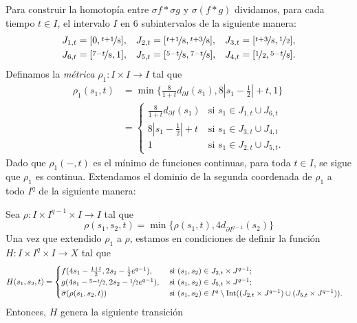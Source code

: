 \begin{dem}
    Para construir la homotopía entre $\sigma f*\sigma g$ y $\sigma (f*g)$ dividamos, para cada tiempo $t\in I$, el intervalo $I$ en 6 subintervalos  de la siguiente manera:
   \begin{align*}
    J_{1,t} &= [0, \nicefrac{t+1}{8}], & J_{2,t} &= [\nicefrac{t+1}{8}, \nicefrac{t+3}{8}], & J_{3,t} &= [\nicefrac{t+3}{8}, \nicefrac{1}{2}], \\
    J_{6,t} &= [\nicefrac{7-t}{8}, 1], & J_{5,t} &= [\nicefrac{5-t}{8}, \nicefrac{7-t}{8}], & J_{4,t} &= [\nicefrac{1}{2}, \nicefrac{5-t}{8}].
\end{align*}
    Definamos la \textit{métrica} $\rho_1:I\times I\to I$ tal que
    \begin{align*}
        \rho_1(s_1,t)&=\min\{\textstyle\frac{8}{1+t}d_{\partial I}(s_1),8|s_1-\frac{1}{2}|+t,1\}\\
        &=\begin{cases}
            \textstyle\frac{8}{1+t}d_{\partial I}(s_1)& \text{si } s_1\in J_{1,t}\cup J_{6,t}\\
            8|s_1-\frac{1}{2}|+t& \text{si } s_1\in J_{3,t}\cup J_{4,t}\\
            1&\text{si } s_1\in J_{2,t}\cup J_{5,t}.
        \end{cases}
    \end{align*}
    Dado que $\rho_1(-,t)$ es el mínimo de funciones continuas, para toda $t\in I$, se sigue que $\rho_1$ es continua. Extendamos el dominio de la segunda coordenada de $\rho_1$ a todo $I^q$ de la siguiente manera: 
    
    Sea $\rho:I\times I^{q-1}\times I\to I$ tal que
    \[
    \rho(s_1,s_2,t)=\min\{\rho(s_1,t),4d_{\partial I^{q-1}}(s_2)\}
    \]
    Una vez que extendido $\rho_1$ a $\rho$, estamos en condiciones de definir la función $H:I\times I^q\times I\to X$ tal que
    \begin{align*}
        H(s_1,s_2,t)&=\begin{cases}
            f(4s_1-\frac{1+t}{2},2s_2-\frac{1}{2}e^{q-1}), & \text{ si } (s_1,s_2)\in J_{2,t}\times J^{q-1};\\
            g(4s_1-\nicefrac{5-t}{2},2s_2-\nicefrac{1}{2}e^{q-1}), & \text{ si } (s_1,s_2)\in J_{5,t}\times J^{q-1};\\
            \overline{\sigma}(\rho(s_1,s_2,t))
            & \text{ si } (s_1,s_2)\in I^q\setminus \mathrm{Int}((J_{2,t}\times J^{q-1})\cup (J_{5,t}\times J^{q-1})).
        \end{cases}
    \end{align*}
    Entonces, $H$ genera la siguiente transición 
        \begin{center}
\newcommand{\drawstate}[2]{
    \def\t{#1}

}
\end{center}
\end{dem}
